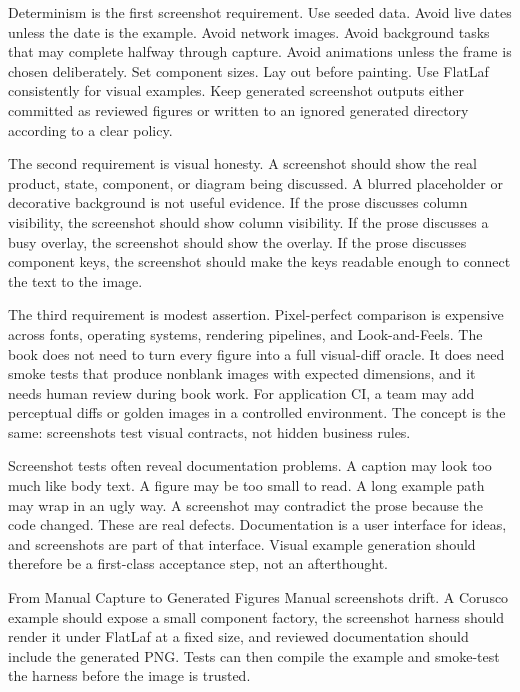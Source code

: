 Determinism is the first screenshot requirement. Use seeded data. Avoid live dates unless the date is the example. Avoid network images. Avoid background tasks that may complete halfway through capture. Avoid animations unless the frame is chosen deliberately. Set component sizes. Lay out before painting. Use FlatLaf consistently for visual examples. Keep generated screenshot outputs either committed as reviewed figures or written to an ignored generated directory according to a clear policy.

The second requirement is visual honesty. A screenshot should show the real product, state, component, or diagram being discussed. A blurred placeholder or decorative background is not useful evidence. If the prose discusses column visibility, the screenshot should show column visibility. If the prose discusses a busy overlay, the screenshot should show the overlay. If the prose discusses component keys, the screenshot should make the keys readable enough to connect the text to the image.

The third requirement is modest assertion. Pixel-perfect comparison is expensive across fonts, operating systems, rendering pipelines, and Look-and-Feels. The book does not need to turn every figure into a full visual-diff oracle. It does need smoke tests that produce nonblank images with expected dimensions, and it needs human review during book work. For application CI, a team may add perceptual diffs or golden images in a controlled environment. The concept is the same: screenshots test visual contracts, not hidden business rules.

Screenshot tests often reveal documentation problems. A caption may look too much like body text. A figure may be too small to read. A long example path may wrap in an ugly way. A screenshot may contradict the prose because the code changed. These are real defects. Documentation is a user interface for ideas, and screenshots are part of that interface. Visual example generation should therefore be a first-class acceptance step, not an afterthought.

\begin{migrationbox}{From Manual Capture to Generated Figures}
Manual screenshots drift. A Corusco example should expose a small component factory, the screenshot harness should render it under FlatLaf at a fixed size, and reviewed documentation should include the generated PNG. Tests can then compile the example and smoke-test the harness before the image is trusted.
\end{migrationbox}


